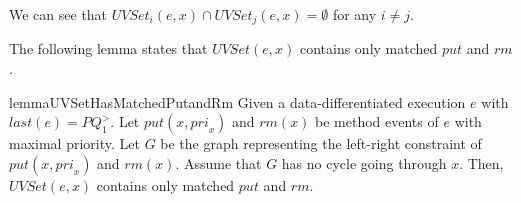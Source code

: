 We can see that $\textit{UVSet}_i(e,x) \cap \textit{UVSet}_j(e,x) = \emptyset$ for any $i \neq j$.

The following lemma states that $\textit{UVSet}(e,x)$ contains only matched $\textit{put}$ and $\textit{rm}$.

\begin{restatable}{lemma}{UVSetHasMatchedPutandRm}
\label{lemma:UVSet has matched put and rm}
Given a data-differentiated execution $e$ with $\textit{last}(e) = \textit{PQ}_1^{>}$. Let $\textit{put}(x,\textit{pri}_x)$ and $\textit{rm}(x)$ be method events of $e$ with maximal priority. Let $G$ be the graph representing the left-right constraint of $\textit{put}(x,\textit{pri}_x)$ and $\textit{rm}(x)$. Assume that $G$ has no cycle going through $x$. Then, $\textit{UVSet}(e,x)$ contains only matched $\textit{put}$ and $\textit{rm}$.
\end{restatable}
